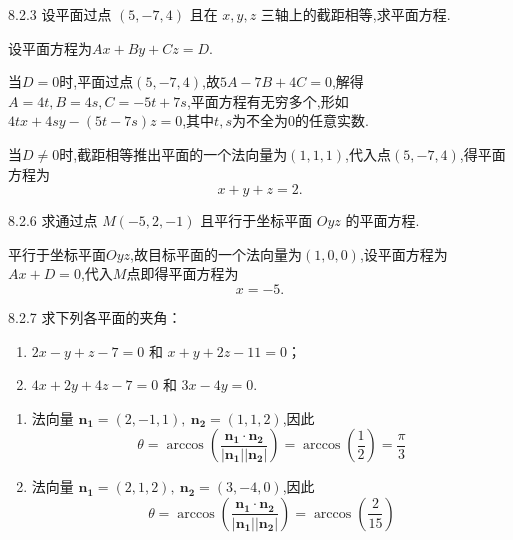 \begin{exercise}{8.2.3}
    设平面过点 $(5, -7, 4)$ 且在 $x, y, z$ 三轴上的截距相等,求平面方程.
\end{exercise}

\begin{solution}
    设平面方程为$ Ax + By + Cz = D$.

    当$D = 0$时,平面过点$(5,-7,4)$,故$5A - 7B + 4C = 0$,解得$A =4t, B = 4s, C = -5t+7s$,平面方程有无穷多个,形如$4tx + 4sy - (5t - 7s)z = 0$,其中$t,s$为不全为$0$的任意实数.

    当$D \neq 0 $时,截距相等推出平面的一个法向量为$(1,1,1)$,代入点$(5,-7,4)$,得平面方程为
    $$
    x + y + z = 2.
    $$
\end{solution}

\begin{exercise}{8.2.6}
    求通过点 $ M(-5, 2, -1) $ 且平行于坐标平面 $ Oyz $ 的平面方程.
\end{exercise}

\begin{solution}
    平行于坐标平面$Oyz$,故目标平面的一个法向量为$(1,0,0)$,设平面方程为$Ax+D=0$,代入$M$点即得平面方程为
    $$
    x = -5.
    $$
\end{solution}

\begin{exercise}{8.2.7}
    求下列各平面的夹角：
\begin{enumerate}
  \item $ 2x - y + z - 7 = 0 $ 和 $ x + y + 2z - 11 = 0 $；
  \item $ 4x + 2y + 4z - 7 = 0 $ 和 $ 3x - 4y = 0 $.
\end{enumerate}
\end{exercise}

\begin{solution}
    \begin{enumerate}
        \item 法向量 $ \mathbf{n_1} = (2, -1, 1), \ \mathbf{n_2} = (1, 1, 2) $,因此
        \[
        \theta = \arccos\left( \frac{\mathbf{n_1} \cdot \mathbf{n_2}}{|\mathbf{n_1}| |\mathbf{n_2}|} \right) = \arccos\left( \frac{1}{2} \right) = \frac{\pi}{3}
        \]
        \item 法向量 $ \mathbf{n_1} = (2, 1, 2), \ \mathbf{n_2} = (3, -4, 0) $,因此
        \[
        \theta = \arccos\left( \frac{\mathbf{n_1} \cdot \mathbf{n_2}}{|\mathbf{n_1}| |\mathbf{n_2}|} \right) = \arccos\left( \frac{2}{15} \right)
        \]
    \end{enumerate}
\end{solution}

